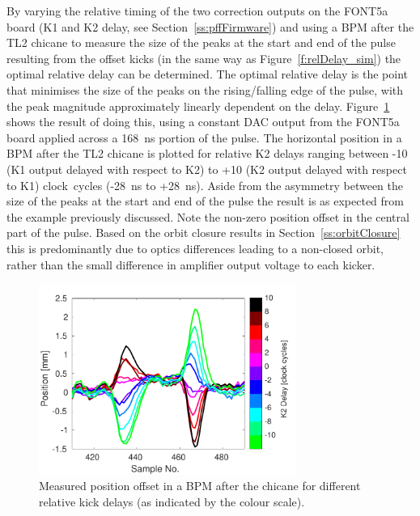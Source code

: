 By varying the relative timing of the two correction outputs on the FONT5a board (K1 and K2 delay, see Section~\ref{ss:pffFirmware}) and using a BPM after the TL2 chicane to measure the size of the peaks at the start and end of the pulse resulting from the offset kicks (in the same way as Figure~\ref{f:relDelay_sim}) the optimal relative delay can be determined. The optimal relative delay is the point that minimises the size of the peaks on the rising/falling edge of the pulse, with the peak magnitude  approximately linearly dependent on the delay. Figure~\ref{f:relDelay_traces} shows the result of doing this, using a constant DAC output from the FONT5a board applied across a 168~ns portion of the pulse. The horizontal position in a BPM after the TL2 chicane is plotted for relative K2 delays ranging between -10 (K1 output delayed with respect to K2) to +10 (K2 output delayed with respect to K1) clock~cycles (-28~ns to +28~ns). Aside from the asymmetry between the size of the peaks at the start and end of the pulse the result is as expected from the example previously discussed. Note the non-zero position offset in the central part of the pulse. Based on the orbit closure results in Section~\ref{ss:orbitClosure} this is predominantly due to optics differences leading to a non-closed orbit, rather than the small difference in amplifier output voltage to each kicker.

\begin{figure}
  \centering
  \includegraphics[width=0.75\textwidth]{Figures/commissioning/relDelay_traces}
  \caption{Measured position offset in a BPM after the chicane for different relative kick delays (as indicated by the colour scale).}
  \label{f:relDelay_traces}
\end{figure}

